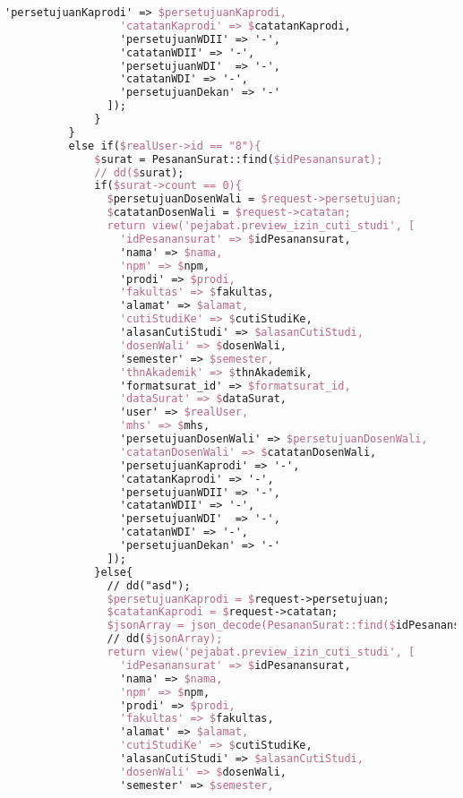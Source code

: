 \begin{lstlisting}[language=tex,basicstyle=\tiny,caption=PesanansuratController.php]
                  'persetujuanKaprodi' => $persetujuanKaprodi,
                  'catatanKaprodi' => $catatanKaprodi,
                  'persetujuanWDII' => '-',
                  'catatanWDII' => '-',
                  'persetujuanWDI'  => '-',
                  'catatanWDI' => '-',
                  'persetujuanDekan' => '-'
                ]);
              }
          }
          else if($realUser->id == "8"){
              $surat = PesananSurat::find($idPesanansurat);
              // dd($surat);
              if($surat->count == 0){
                $persetujuanDosenWali = $request->persetujuan;
                $catatanDosenWali = $request->catatan;
                return view('pejabat.preview_izin_cuti_studi', [
                  'idPesanansurat' => $idPesanansurat,
                  'nama' => $nama,
                  'npm' => $npm,
                  'prodi' => $prodi,
                  'fakultas' => $fakultas,
                  'alamat' => $alamat,
                  'cutiStudiKe' => $cutiStudiKe,
                  'alasanCutiStudi' => $alasanCutiStudi,
                  'dosenWali' => $dosenWali,
                  'semester' => $semester,
                  'thnAkademik' => $thnAkademik,
                  'formatsurat_id' => $formatsurat_id,
                  'dataSurat' => $dataSurat,
                  'user' => $realUser,
                  'mhs' => $mhs,
                  'persetujuanDosenWali' => $persetujuanDosenWali,
                  'catatanDosenWali' => $catatanDosenWali,
                  'persetujuanKaprodi' => '-',
                  'catatanKaprodi' => '-',
                  'persetujuanWDII' => '-',
                  'catatanWDII' => '-',
                  'persetujuanWDI'  => '-',
                  'catatanWDI' => '-',
                  'persetujuanDekan' => '-'
                ]);
              }else{
                // dd("asd");
                $persetujuanKaprodi = $request->persetujuan;
                $catatanKaprodi = $request->catatan;
                $jsonArray = json_decode(PesananSurat::find($idPesanansurat)->dataSurat);
                // dd($jsonArray);
                return view('pejabat.preview_izin_cuti_studi', [
                  'idPesanansurat' => $idPesanansurat,
                  'nama' => $nama,
                  'npm' => $npm,
                  'prodi' => $prodi,
                  'fakultas' => $fakultas,
                  'alamat' => $alamat,
                  'cutiStudiKe' => $cutiStudiKe,
                  'alasanCutiStudi' => $alasanCutiStudi,
                  'dosenWali' => $dosenWali,
                  'semester' => $semester,

\end{lstlisting}
